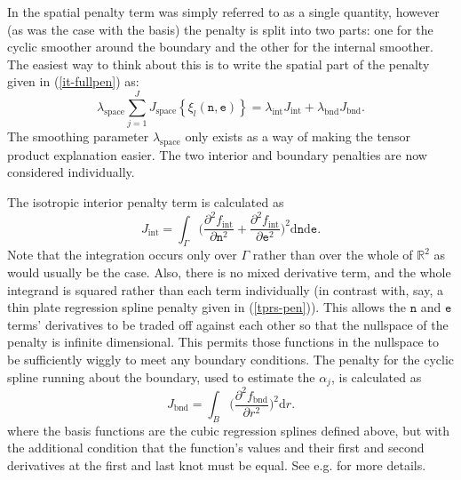 In  the spatial penalty term was simply referred to as a single quantity, however (as was the case with the basis) the penalty is split into two parts: one for the cyclic smoother around the boundary and the other for the internal smoother. The easiest way to think about this is to write the spatial part of the penalty given in (\ref{it-fullpen}) as:
\begin{equation*}
\lambda_\text{space} \sum_{j=1}^J J_\text{space}\left\{  \xi_l(\texttt{n},\texttt{e}) \right\} = \lambda_\text{int} J_\text{int} + \lambda_\text{bnd} J_\text{bnd}.
\end{equation*}
The smoothing parameter $\lambda_\text{space}$ only exists as a way of making the tensor product explanation easier. The two interior and boundary penalties are now considered individually.


The isotropic interior penalty term is calculated as
$$
J_\text{int} = \int_\Gamma \Big(\frac{\partial^2 f_\text{int}}{\partial \texttt{n}^2}+\frac{\partial^2 f_\text{int}}{\partial \texttt{e}^2} 
\Big)^2\text{d}\texttt{n}\text{d}\texttt{e}.
$$
Note that the integration occurs only over $\Gamma$ rather than over the whole of $\mathbb{R}^2$ as would usually be the case. Also, there is no mixed derivative term, and the whole integrand is squared rather than each term individually (in contrast with, say, a thin plate regression spline penalty given in (\ref{tprs-pen})). This allows the $\texttt{n}$ and $\texttt{e}$ terms' derivatives to be traded off against each other so that the nullspace of the penalty is infinite dimensional. This permits those functions in the nullspace to be sufficiently wiggly to meet any boundary conditions. The penalty for the cyclic spline running about the boundary, used to estimate the $\alpha_j$, is calculated as 
$$
J_\text{bnd} = \int_B \Big(\frac{\partial^2 f_\text{bnd}}{\partial r^2}\Big)^2 \text{d}r.
$$
where the basis functions are the cubic regression splines defined above, but with the additional condition that the function's values and their first and second derivatives at the first and last knot must be equal. See e.g. \cite[p. 149]{simonbook} for more details.

